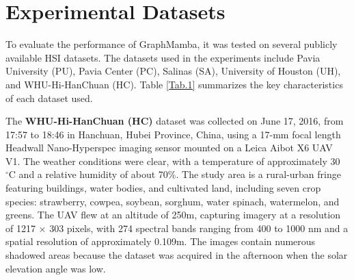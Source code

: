 \documentclass[journal]{IEEEtran}
\begin{document}
\section{Experimental Datasets}
\label{Data}

To evaluate the performance of GraphMamba, it was tested on several publicly available HSI datasets. The datasets used in the experiments include Pavia University (PU), Pavia Center (PC), Salinas (SA), University of Houston (UH), and WHU-Hi-HanChuan (HC). Table \ref{Tab.1} summarizes the key characteristics of each dataset used.
\begin{table}[!hbt]
    \centering
    \caption{Summary of the HSI datasets used for experimental evaluation.}
    \label{Tab.1}
\end{table}

The \textbf{WHU-Hi-HanChuan (HC)} dataset was collected on June 17, 2016, from 17:57 to 18:46 in Hanchuan, Hubei Province, China, using a 17-mm focal length Headwall Nano-Hyperspec imaging sensor mounted on a Leica Aibot X6 UAV V1. The weather conditions were clear, with a temperature of approximately 30$^\circ\mathrm{C}$ and a relative humidity of about 70\%. The study area is a rural-urban fringe featuring buildings, water bodies, and cultivated land, including seven crop species: strawberry, cowpea, soybean, sorghum, water spinach, watermelon, and greens. The UAV flew at an altitude of 250m, capturing imagery at a resolution of 1217 $\times$ 303 pixels, with 274 spectral bands ranging from 400 to 1000 nm and a spatial resolution of approximately 0.109m. The images contain numerous shadowed areas because the dataset was acquired in the afternoon when the solar elevation angle was low.
\end{document}
